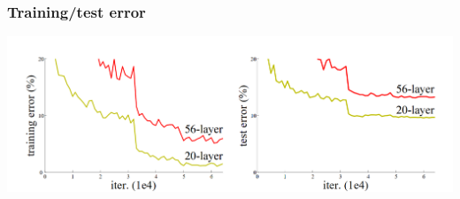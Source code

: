 \documentclass{beamer}
\begin{document}
\begin{frame}
    \frametitle{Training/test error}
\begin{center}
    \includegraphics[width=\textwidth]{figs/deeper-error.png}
\end{center}

\end{frame}
\end{document}
